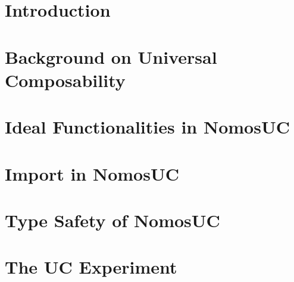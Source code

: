 \documentclass[conference]{IEEEtran}
\begin{document}

\section{Introduction} \label{sec:intro}


\section{Background on Universal Composability} \label{sec:background}


\section{Ideal Functionalities in NomosUC} \label{sec:example}


\section{Import in NomosUC} \label{sec:motivate}


%
%
%

\section{Type Safety of NomosUC} \label{sec:safety}


\section{The UC Experiment} \label{sec:execuc}


%

%
%
\end{document}
